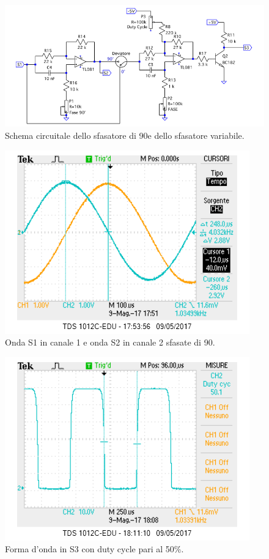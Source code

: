\documentclass[10pt,a4paper]{article}
\begin{document}
 

\begin{figure}[!htb]
  \centering
  \includegraphics[scale=0.75]{sfasatori.png}
\caption{Schema circuitale dello sfasatore di 90\degree e dello sfasatore variabile.\label{fig:sfasatori}}
\end{figure}

\begin{figure}[!htb]
  \centering
  \includegraphics[scale=0.75]{sfasamento90.png}
\caption{Onda S1 in canale 1 e onda S2 in canale 2 sfasate di 90\degree.\label{osc:sfasamento}}
\end{figure}

\begin{figure}[!htb]
\centering
  \includegraphics[scale=0.75]{dutycycle50.png}
\caption{Forma d'onda in S3 con duty cycle pari al 50\%. 
\label{osc:duty}}
\end{figure}
\end{document}

